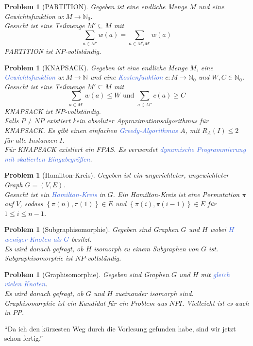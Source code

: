 \documentclass[11pt]{scrartcl}
\newcommand{\tcol}[1]{\textcolor{RoyalBlue}{#1}}
\newcommand{\set}[1]{\left\lbrace #1\right\rbrace}
\theoremstyle{break}
\newtheorem{prob}[satz]{Problem}
\begin{document}
    \begin{prob}[PARTITION]
        Gegeben ist eine endliche Menge $M$ und eine Gewichtsfunktion $w\colon M\to\mathbb{N}
        _0$.\\
        Gesucht ist eine Teilmenge $M'\subseteq M$ mit
        \[\sum_{a\in M'}w(a)=\sum_{a\in M\setminus M'}w(a)\]
        PARTITION ist $NP$-vollständig.
    \end{prob}

    \begin{prob}[KNAPSACK]
        Gegeben ist eine endliche Menge $M$, eine \tcol{Gewichtsfunktion} $w\colon M\to\mathbb{N}$ und eine \tcol{Kostenfunktion} $c\colon M\to\mathbb{N}
        _0$ und $W,C\in\mathbb{N}_0$.\\
        Gesucht ist eine Teilmenge $M'\subseteq M$ mit
        \[\sum_{a\in M'}w(a)\leq W\text{ und }\sum_{a\in M'}c(a)\geq C\]
        KNAPSACK ist $NP$-vollständig.\\
        Falls $P\neq NP$ existiert kein absoluter Approximationsalgorithmus für KNAPSACK. Es gibt einen einfachen \tcol{Greedy-Algorithmus} $A$, mit $R_A(I)\leq 2$ für alle Instanzen $I$.\\
        Für KNAPSACK existiert ein FPAS. Es verwendet \tcol{dynamische Programmierung mit skalierten Eingabegrößen}.
    \end{prob}

    \begin{prob}[Hamilton-Kreis]
        Gegeben ist ein ungerichteter, ungewichteter Graph $G=(V,E)$.\\
        Gesucht ist ein \tcol{Hamilton-Kreis} in $G$.
        Ein Hamilton-Kreis ist eine Permutation $\pi$ auf $V$, sodass $\set{\pi(n),\pi(1)}\in E$ und $\set{\pi(i),\pi(i-1)}\in E$ für $1\leq i\leq n-1$.
    \end{prob}

    \begin{prob}[Subgraphisomorphie]
        Gegeben sind Graphen $G$ und $H$ wobei \tcol{$H$ weniger Knoten als $G$} besitzt.\\
        Es wird danach gefragt, ob $H$ isomorph zu einem Subgraphen von $G$ ist.\\
        Subgraphisomorphie ist $NP$-vollständig.
    \end{prob}

    \begin{prob}[Graphisomorphie]
        Gegeben sind Graphen $G$ und $H$ mit \tcol{gleich vielen Knoten}.\\
        Es wird danach gefragt, ob $G$ und $H$ zueinander isomorph sind.\\
        Graphisomorphie ist ein Kandidat für ein Problem aus $NPI$.
        Vielleicht ist es auch in $P$P.
    \end{prob}

    \newpage
    \enquote{Da ich den kürzesten Weg durch die Vorlesung gefunden habe, sind wir jetzt schon fertig.}
\end{document}
